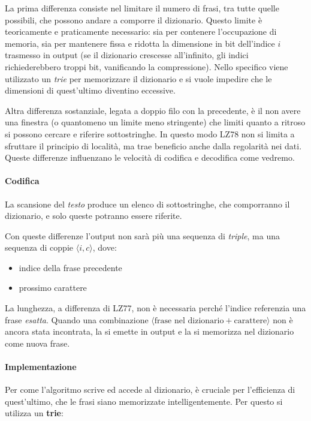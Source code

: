 La prima differenza consiste nel limitare il numero di frasi, tra tutte quelle possibili, che possono andare a comporre il dizionario. Questo limite è teoricamente e praticamente necessario: sia per contenere l'occupazione di memoria, sia per mantenere fissa e ridotta la dimensione in bit dell'indice $i$ trasmesso in output (se il dizionario crescesse all'infinito, gli indici richiederebbero troppi bit, vanificando la compressione). Nello specifico viene utilizzato un \textit{trie} per memorizzare il dizionario e si vuole impedire che le dimensioni di quest'ultimo diventino eccessive.

Altra differenza sostanziale, legata a doppio filo con la precedente, è il non avere una finestra (o quantomeno un limite meno stringente) che limiti quanto a ritroso si possono cercare e riferire sottostringhe. In questo modo LZ78 non si limita a sfruttare il principio di località, ma trae beneficio anche dalla regolarità nei dati. Queste differenze influenzano le velocità di codifica e decodifica come vedremo.

\paragraph{Codifica}
La scansione del \textit{testo} produce un elenco di sottostringhe, che comporranno il dizionario, e solo queste potranno essere riferite.

Con queste differenze l'output non sarà più una sequenza di \textit{triple}, ma una sequenza di coppie $\langle i, c \rangle$, dove:
\begin{itemize}
    \item[$i$] indice della frase precedente
    \item[$c$] prossimo carattere
\end{itemize}
La lunghezza, a differenza di LZ77, non è necessaria perché l'indice referenzia una frase \textit{esatta}. Quando una combinazione $\langle \text{frase nel dizionario} + \text{carattere} \rangle$ non è ancora stata incontrata, la si emette in output e la si memorizza nel dizionario come nuova frase.

\paragraph{Implementazione}
Per come l'algoritmo scrive ed accede al dizionario, è cruciale per l'efficienza di quest'ultimo, che le frasi siano memorizzate intelligentemente.
Per questo si utilizza un \textbf{trie}:

